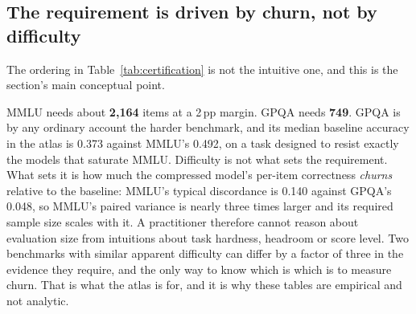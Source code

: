 \subsection{The requirement is driven by churn, not by difficulty}

The ordering in Table~\ref{tab:certification} is not the intuitive one, and this
is the section's main conceptual point.

MMLU needs about \textbf{2{,}164} items at a 2\,pp margin. GPQA needs
\textbf{749}. GPQA is by any ordinary account the harder benchmark, and its
median baseline accuracy in the atlas is 0.373 against MMLU's 0.492, on a task
designed to resist exactly the models that saturate MMLU. Difficulty is not what
sets the requirement. What sets it is how much the compressed model's per-item
correctness \emph{churns} relative to the baseline: MMLU's typical discordance
is 0.140 against GPQA's 0.048, so MMLU's paired variance is nearly three times
larger and its required sample size scales with it. A practitioner therefore
cannot reason about evaluation size from intuitions about task hardness,
headroom or score level. Two benchmarks with similar apparent difficulty can
differ by a factor of three in the evidence they require, and the only way to
know which is which is to measure churn. That is what the atlas is for, and it
is why these tables are empirical and not analytic.

